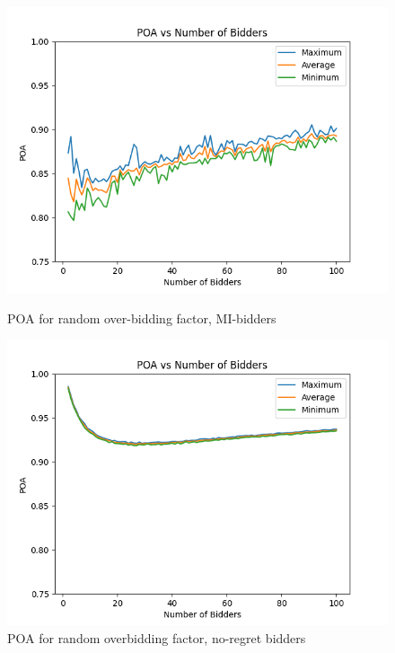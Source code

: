\documentclass[12pt,twoside]{reedthesis}
\begin{document}
\begin{figure}
	\centering
	\begin{minipage}{0.49\textwidth}
		\centering
		\includegraphics[scale=0.5]{Figures/zi_random_overbidding}
		\caption{POA for random over-bidding factor, MI-bidders}
		\label{mi_random_overbidders}
	\end{minipage}
	\begin{minipage}{0.49\textwidth}
		\centering
		\includegraphics[scale=0.5]{Figures/symmetric_random_overbidding}
		\caption{POA for random overbidding factor, no-regret bidders}
		\label{random_overbidders}
	\end{minipage}
\end{figure}
\end{document}
